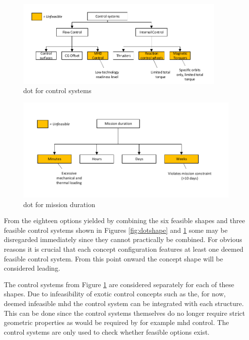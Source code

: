\begin{figure}[H]
\centering
\includegraphics[width = 0.93\textwidth]{Figure/DOT_control.pdf}
\vspace{-5mm}
\caption{\acrfull{dot} for control systems}
\label{fig:dotcontrol}
\end{figure}

\begin{figure}[H]
\centering
\includegraphics[width = 1.0\textwidth]{Figure/DOT_missionduration.pdf}
\vspace{-5mm}
\caption{\acrfull{dot} for mission duration}
\label{fig:dotduration}
\end{figure}

From the eighteen options yielded by combining the six feasible shapes and three feasible control systems shown in Figures \ref{fig:dotshape} and \ref{fig:dotcontrol} some may be disregarded immediately since they cannot practically be combined. For obvious reasons it is crucial that each concept configuration features at least one deemed feasible control system. From this point onward the concept shape will be considered leading. 

The control systems from Figure  \ref{fig:dotcontrol} are considered separately for each of these shapes. Due to infeasibility of exotic control concepts such as the, for now, deemed infeasible \gls{mhd} the control system can be integrated with each structure. This can be done since the control systems themselves do no longer require strict geometric properties as would be required by for example \gls{mhd} control. The control systems are only used to check whether feasible options exist.

